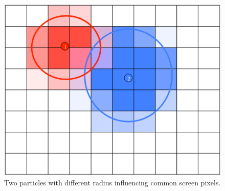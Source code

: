 \documentclass[preprint,5pt]{elsarticle}
\begin{document}

\begin{figure}
\centering
\includegraphics[scale=0.1]{particles.eps}
\caption{Two particles with different radius influencing common screen pixels.}
\label{fig:particles}
\end{figure}
\end{document}
